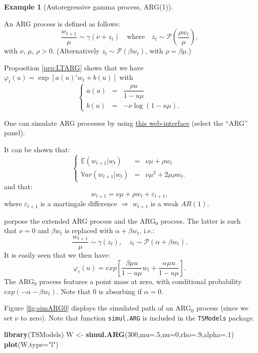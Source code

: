 \documentclass[
  12pt,
]{book}
\newenvironment{Shaded}{\begin{snugshade}}{\end{snugshade}}
\newcommand{\AttributeTok}[1]{\textcolor[rgb]{0.13,0.29,0.53}{#1}}
\newcommand{\DecValTok}[1]{\textcolor[rgb]{0.00,0.00,0.81}{#1}}
\newcommand{\FunctionTok}[1]{\textcolor[rgb]{0.13,0.29,0.53}{\textbf{#1}}}
\newcommand{\NormalTok}[1]{#1}
\newcommand{\OtherTok}[1]{\textcolor[rgb]{0.56,0.35,0.01}{#1}}
\newcommand{\StringTok}[1]{\textcolor[rgb]{0.31,0.60,0.02}{#1}}
\theoremstyle{definition}
\theoremstyle{definition}
\newtheorem{example}{Example}[chapter]
\theoremstyle{definition}
\theoremstyle{definition}
\theoremstyle{remark}
\begin{document}
\begin{example}[Autoregressive gamma process, ARG(1)]
\protect\hypertarget{exm:ARG1}{}\label{exm:ARG1}

An ARG process is defined as follows:
\[
\frac{w_{t+1}}{\mu} \sim \gamma(\nu+z_t) \quad \mbox{where} \quad z_t \sim \mathcal{P} \left( \frac{\rho w_t}{\mu} \right),
\]
with \(\nu\), \(\mu\), \(\rho > 0\). (Alternatively \(z_t \sim {\mathcal{P}}(\beta w_t)\), with \(\rho = \beta \mu\).)

Proposition \ref{prp:LTARG} shows that we have \(\varphi_t(u) = \exp[a(u)'w_t+b(u)]\) with
\[
\left\{
\begin{array}{ccc}
a(u) &=&  \dfrac{\rho u}{1-u \mu}\\
b(u) &=& -\nu  
\log(1-u \mu).
\end{array}
\right.
\]

One can simulate ARG processes by using \href{https://jrenne.shinyapps.io/Affine/}{this web-interface} (select the ``ARG'' panel).

It can be shown that:
\[
\left\{
\begin{array}{ccc}
\mathbb{E}(w_{t+1}|\underline{w_t}) &=& \nu \mu + \rho w_t \\
\mathbb{V}ar(w_{t+1}|\underline{w_t}) &=& \nu \mu^2 + 2 \mu \rho w_t.
\end{array}
\right.
\]
and that:
\[
w_{t+1}=\nu\mu+\rho w_t+\varepsilon_{t+1},
\]
where \(\varepsilon_{t+1}\) is a martingale difference \(\Rightarrow\) \(w_{t+1}\) is a weak \(AR(1)\).

\citet{zarg_2017} porpose the extended ARG process and the ARG\(_0\) process. The latter is such that \(\nu = 0\) and \(\beta w_t\) is replaced with \(\alpha + \beta w_t\), i.e.:
\begin{equation}
\frac{w_{t+1}}{\mu} \sim \gamma(z_t),\quad z_t \sim {\mathcal{P}}(\alpha + \beta w_t).\label{eq:ARG0}
\end{equation}
It is easily seen that we then have:
\[
\varphi_t(u) = exp \left[\frac{\beta \mu u}{1-u \mu} w_t + \frac{\alpha \mu u}{1-u \mu}
\right].
\]
The ARG\(_0\) process features a point mass at zero, with conditional probability \(exp(-\alpha - \beta w_t)\). Note that 0 is absorbing if \(\alpha = 0\).

Figure \ref{fig:simARG0} displays the simulated path of an ARG\(_0\) process (since we set \(\nu\) to zero). Note that function \texttt{simul.ARG} is included in the \texttt{TSModels} package.

\begin{Shaded}
\begin{Highlighting}[]
\FunctionTok{library}\NormalTok{(TSModels)}
\NormalTok{W }\OtherTok{\textless{}{-}} \FunctionTok{simul.ARG}\NormalTok{(}\DecValTok{300}\NormalTok{,}\AttributeTok{mu=}\NormalTok{.}\DecValTok{5}\NormalTok{,}\AttributeTok{nu=}\DecValTok{0}\NormalTok{,}\AttributeTok{rho=}\NormalTok{.}\DecValTok{9}\NormalTok{,}\AttributeTok{alpha=}\NormalTok{.}\DecValTok{1}\NormalTok{)}
\FunctionTok{plot}\NormalTok{(W,}\AttributeTok{type=}\StringTok{"l"}\NormalTok{)}
\end{Highlighting}
\end{Shaded}


\end{example}
\end{document}
